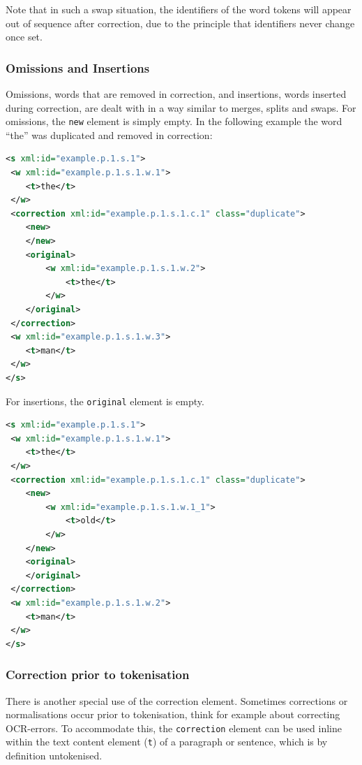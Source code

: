 \documentclass[a4paper,12pt]{report}
\begin{document}
Note that in such a swap situation, the identifiers of the word tokens will appear out of sequence after correction, due to the principle that identifiers never change once set.


\subsubsection{Omissions and Insertions}

Omissions, words that are removed in correction, and insertions, words inserted during correction, are dealt with in a way similar to merges, splits and swaps. For omissions, the \texttt{new} element is simply empty. In the following example the word ``the'' was duplicated and removed in correction:

\begin{lstlisting}[language=xml]
<s xml:id="example.p.1.s.1">
 <w xml:id="example.p.1.s.1.w.1">
    <t>the</t>
 </w>
 <correction xml:id="example.p.1.s.1.c.1" class="duplicate">
    <new>                        
    </new>
    <original>
        <w xml:id="example.p.1.s.1.w.2">
            <t>the</t>
        </w>
    </original>
 </correction>  
 <w xml:id="example.p.1.s.1.w.3">
    <t>man</t>
 </w>
</s>
\end{lstlisting}

For insertions, the \texttt{original} element is empty. 

\begin{lstlisting}[language=xml]
<s xml:id="example.p.1.s.1">
 <w xml:id="example.p.1.s.1.w.1">
    <t>the</t>
 </w>
 <correction xml:id="example.p.1.s.1.c.1" class="duplicate">
    <new>                            
        <w xml:id="example.p.1.s.1.w.1_1">
            <t>old</t>
        </w>
    </new>
    <original>
    </original>
 </correction>  
 <w xml:id="example.p.1.s.1.w.2">
    <t>man</t>
 </w>
</s>
\end{lstlisting}


\subsubsection{Correction prior to tokenisation} 

There is another special use of the correction element. Sometimes corrections or normalisations occur prior to tokenisation, think for example about correcting OCR-errors. To accommodate this, the \texttt{correction} element can be used inline within the text content element (\texttt{t}) of a paragraph or sentence, which is by definition untokenised.
\end{document}
